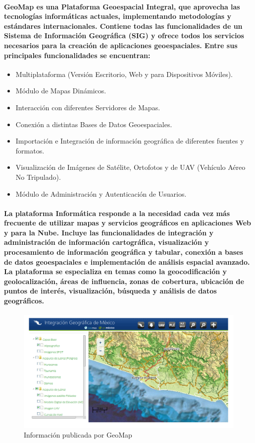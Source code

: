     \paragraph{GeoMap es una Plataforma Geoespacial Integral, que aprovecha las tecnologías informáticas actuales, implementando metodologías y estándares internacionales. Contiene todas las funcionalidades de un Sistema de Información Geográfica (SIG) y ofrece todos los servicios necesarios para la creación de aplicaciones geoespaciales.  Entre sus principales funcionalidades se encuentran: }
    \begin{itemize}
      \item Multiplataforma (Versión Escritorio, Web y para Dispositivos Móviles).
      \item Módulo de Mapas Dinámicos.
      \item Interacción con diferentes Servidores de Mapas.
      \item Conexión a distintas Bases de Datos Geoespaciales.
      \item Importación e Integración de información geográfica de diferentes fuentes y formatos.
      \item Visualización de Imágenes de Satélite, Ortofotos y de UAV (Vehículo Aéreo No Tripulado).
      \item Módulo de Administración y Autenticación de Usuarios. 
    \end{itemize}
    \paragraph{La plataforma Informática responde a la necesidad cada vez más frecuente de utilizar mapas y servicios geográficos en aplicaciones Web y para la Nube. Incluye las funcionalidades de integración y administración de información cartográfica, visualización y procesamiento de información geográfica y tabular, conexión a bases de datos geoespaciales e implementación de análisis espacial avanzado. La plataforma se especializa en temas como la geocodificación y geolocalización, áreas de influencia, zonas de cobertura, ubicación de puntos de interés, visualización, búsqueda y análisis de datos geográficos.}
    \begin{figure}[h!]
      \centering
        \includegraphics[width=\textwidth]{./images/GeoMap.png}
      \caption{Información publicada por GeoMap}
    \end{figure}
